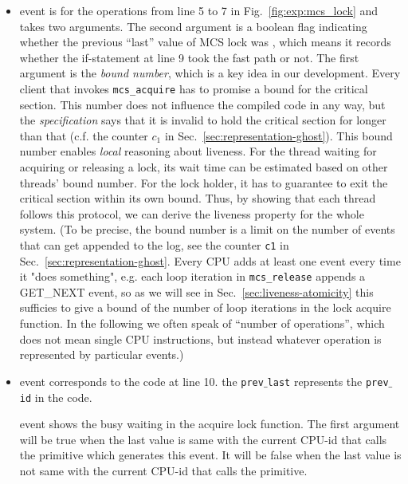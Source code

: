 \begin{itemize}

\item \textbf{{}} event is for the
operations from line 5 to 7 in Fig.~\ref{fig:exp:mcs_lock} and takes
two arguments. The second argument is a boolean flag indicating
whether the previous ``last'' value of MCS lock was \invalidmcsval,
which means it records whether the if-statement at line 9 took the fast path or not.
The first argument is the \emph{bound number}, which is a key idea in
our development. Every client that invokes \lstinline$mcs_acquire$ has
to promise a bound for the critical section. This number
does not influence the compiled code in any way, but the
\emph{specification} says that it is invalid to hold the critical
section for longer than that (c.f. the counter $c_1$ in
Sec.~\ref{sec:representation-ghost}).
This bound number enables \emph{local} reasoning about liveness.
For the thread waiting for acquiring or releasing a lock,
its wait time can be estimated based on other threads' bound number. For the lock holder, it has to guarantee
to exit the critical section within its own bound. 
Thus, by showing that each thread follows this protocol,
we can derive the liveness property for the whole system.
(To be precise, the bound number is a limit on the number of events
that can get appended to the log, see the counter \lstinline$c1$ in
Sec.~\ref{sec:representation-ghost}.
Every CPU adds at least
one event every time it "does something", e.g. each loop iteration in \lstinline$mcs_release$ appends a GET\_NEXT
event, so
as we will see in
Sec.~\ref{sec:liveness-atomicity} this sufficies to give a bound of
the number of loop iterations in the lock acquire function. In the following we often speak of
``number of operations'', which does not mean single CPU instructions,
but instead whatever operation is represented by particular events.)


\item \textbf{} event corresponds to the code at line 10. 
the \texttt{prev$\_$last} represents the \texttt{prev$\_$id} in the code.

\noindent\textbf{} event shows the busy waiting in the acquire lock function.
The first argument will be true when the last value is same with the current CPU-id that calls the primitive which generates this event.
It will be false when the last value is not same with the current CPU-id that calls the primitive.
\end{itemize}


